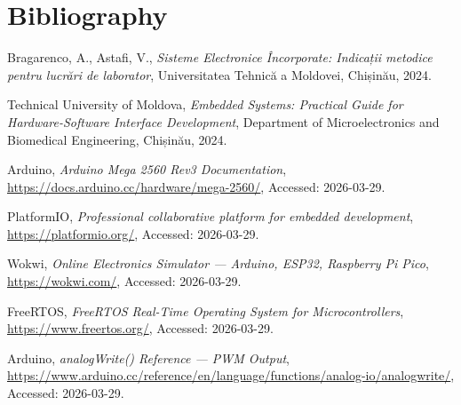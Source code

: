 \section{Bibliography}

\begin{enumerate}[label={[\arabic*]}]
    \item Bragarenco, A., Astafi, V., \textit{Sisteme Electronice \^{I}ncorporate: Indicații metodice pentru lucrări de laborator}, Universitatea Tehnică a Moldovei, Chișinău, 2024.

    \item Technical University of Moldova, \textit{Embedded Systems: Practical Guide for Hardware-Software Interface Development}, Department of Microelectronics and Biomedical Engineering, Chișinău, 2024.

    \item Arduino, \textit{Arduino Mega 2560 Rev3 Documentation}, \url{https://docs.arduino.cc/hardware/mega-2560/}, Accessed: 2026-03-29.

    \item PlatformIO, \textit{Professional collaborative platform for embedded development}, \url{https://platformio.org/}, Accessed: 2026-03-29.

    \item Wokwi, \textit{Online Electronics Simulator --- Arduino, ESP32, Raspberry Pi Pico}, \url{https://wokwi.com/}, Accessed: 2026-03-29.

    \item FreeRTOS, \textit{FreeRTOS Real-Time Operating System for Microcontrollers}, \url{https://www.freertos.org/}, Accessed: 2026-03-29.

    \item Arduino, \textit{analogWrite() Reference --- PWM Output}, \url{https://www.arduino.cc/reference/en/language/functions/analog-io/analogwrite/}, Accessed: 2026-03-29.
\end{enumerate}
